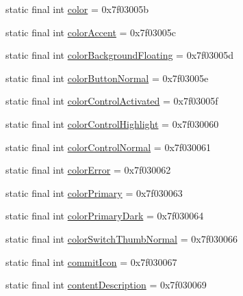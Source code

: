 \begin{DoxyCompactItemize}
\item 
static final int \mbox{\hyperlink{classandroid_1_1support_1_1v7_1_1appcompat_1_1R_1_1attr_afb5b2a3525369f5958bc1b9a46cfa5bb}{color}} = 0x7f03005b
\item 
static final int \mbox{\hyperlink{classandroid_1_1support_1_1v7_1_1appcompat_1_1R_1_1attr_a4fc21f5b8bdbf677fe4c800f10d29cc5}{color\+Accent}} = 0x7f03005c
\item 
static final int \mbox{\hyperlink{classandroid_1_1support_1_1v7_1_1appcompat_1_1R_1_1attr_a9fdc60194f931ad9a9ad112eecb7e9e9}{color\+Background\+Floating}} = 0x7f03005d
\item 
static final int \mbox{\hyperlink{classandroid_1_1support_1_1v7_1_1appcompat_1_1R_1_1attr_a3b6363c6669d5acc385b9a473903bca4}{color\+Button\+Normal}} = 0x7f03005e
\item 
static final int \mbox{\hyperlink{classandroid_1_1support_1_1v7_1_1appcompat_1_1R_1_1attr_a36efdcf7ace558d8b3da55850c9caec1}{color\+Control\+Activated}} = 0x7f03005f
\item 
static final int \mbox{\hyperlink{classandroid_1_1support_1_1v7_1_1appcompat_1_1R_1_1attr_a2f2a6b1281075d3383d89aadab7d7389}{color\+Control\+Highlight}} = 0x7f030060
\item 
static final int \mbox{\hyperlink{classandroid_1_1support_1_1v7_1_1appcompat_1_1R_1_1attr_af9b759f44170b6080c774224c1a74708}{color\+Control\+Normal}} = 0x7f030061
\item 
static final int \mbox{\hyperlink{classandroid_1_1support_1_1v7_1_1appcompat_1_1R_1_1attr_acc0c3c6ddcf1f659b608d6cae5720000}{color\+Error}} = 0x7f030062
\item 
static final int \mbox{\hyperlink{classandroid_1_1support_1_1v7_1_1appcompat_1_1R_1_1attr_a6b434238a296c5672fc1cf8b9fec9a75}{color\+Primary}} = 0x7f030063
\item 
static final int \mbox{\hyperlink{classandroid_1_1support_1_1v7_1_1appcompat_1_1R_1_1attr_ac24f6e897ae5ef7db4ad8ea089ae845d}{color\+Primary\+Dark}} = 0x7f030064
\item 
static final int \mbox{\hyperlink{classandroid_1_1support_1_1v7_1_1appcompat_1_1R_1_1attr_a575438e4886c8729cd069320f003c7c7}{color\+Switch\+Thumb\+Normal}} = 0x7f030066
\item 
static final int \mbox{\hyperlink{classandroid_1_1support_1_1v7_1_1appcompat_1_1R_1_1attr_a1a5044030cb1f7d3843a4e16d8e9fac9}{commit\+Icon}} = 0x7f030067
\item 
static final int \mbox{\hyperlink{classandroid_1_1support_1_1v7_1_1appcompat_1_1R_1_1attr_a8c6272d54d135cbf5546e2a0234f15f8}{content\+Description}} = 0x7f030069

\end{DoxyCompactItemize}
